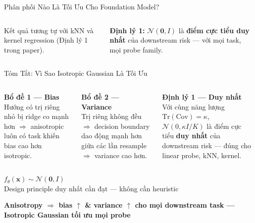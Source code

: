 \documentclass[aspectratio=169,9pt]{beamer}
\newcommand{\takeaway}[1]{%
  \vfill
  \begin{mdframed}[
    linecolor=maccent, linewidth=1.5pt,
    backgroundcolor=mlightgold,
    innertopmargin=5pt, innerbottommargin=5pt,
    innerleftmargin=10pt, innerrightmargin=10pt,
    roundcorner=3pt, skipabove=4pt, skipbelow=0pt
  ]
  \centering\small\bfseries\color{mprimary} #1
  \end{mdframed}%
}
\begin{document}
\begin{frame}{Phân phối Nào Là Tối Ưu Cho Foundation Model?}
\begin{columns}[T]
\vspace{0.45em}
Kết quả tương tự với kNN và kernel regression (Định lý 1 trong paper).

\vspace{0.5em}
\begin{accentbox}
\footnotesize \textbf{Định lý 1:} $\mathcal{N}(\mathbf{0}, I)$ là \textbf{điểm cực tiểu duy nhất} của downstream risk — với mọi task, mọi probe family.
\end{accentbox}

\end{columns}

\end{frame}


\begin{frame}{Tóm Tắt: Vì Sao Isotropic Gaussian Là Tối Ưu}

\begin{columns}[T]
\begin{badbox}
\footnotesize\textbf{Bổ đề 1 — Bias}\\[3pt]
Hướng có trị riêng nhỏ bị ridge co mạnh hơn $\Rightarrow$ anisotropic luôn có task khiến bias cao hơn isotropic.
\end{badbox}

\begin{badbox}
\footnotesize\textbf{Bổ đề 2 — Variance}\\[3pt]
Trị riêng không đều $\Rightarrow$ decision boundary dao động mạnh hơn giữa các lần resample $\Rightarrow$ variance cao hơn.
\end{badbox}

\begin{goodbox}
\footnotesize\textbf{Định lý 1 — Duy nhất}\\[3pt]
Với cùng năng lượng $\mathrm{Tr}(\mathrm{Cov})=\kappa$, $\mathcal{N}(0,\kappa I/K)$ là điểm cực tiểu \textbf{duy nhất} của downstream risk — đúng cho linear probe, kNN, kernel.
\end{goodbox}
\end{columns}

\vspace{0.8em}
\begin{center}
{\Large\bfseries\color{mprimary} $f_\theta(\mathbf{x}) \sim \mathcal{N}(\mathbf{0}, I)$}\\[4pt]
{\small\color{mgray} Design principle duy nhất cần đạt — không cần heuristic}
\end{center}

\takeaway{Anisotropy $\Rightarrow$ bias $\uparrow$ \& variance $\uparrow$ cho mọi downstream task — Isotropic Gaussian tối ưu mọi probe}

\end{frame}
\end{document}
